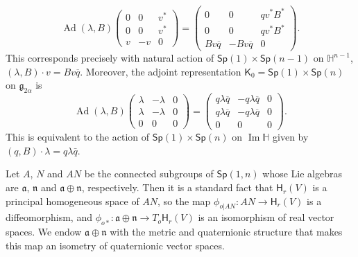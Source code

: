 \documentclass[12pt, a4paper]{amsart}
\newcommand{\g}{\mathfrak}
\newcommand{\Ad}{\operatorname{Ad}}
\renewcommand{\H}{\mathbb{H}}
\renewcommand{\Im}{\operatorname{Im}}
\newcommand{\Sp}{\mathsf{Sp}}
\theoremstyle{remark}
\begin{document}
\[
\Ad(\lambda,B)\left(
\begin{array}{cc|c}
	0 & 0 & v^*\\
	0 & 0 & v^*\\
	\hline
	v & -v & 0
\end{array}
\right)
=\left(
\begin{array}{cc|c}
	0 & 0 & qv^*B^*\\
	0 & 0 & qv^*B^*\\
	\hline
	Bv\overline{q} & -Bv\overline{q} & 0
\end{array}
\right).
\]
This corresponds precisely with natural action of $\mathsf{Sp}(1)\times\mathsf{Sp}(n-1)$ on $\H^{n-1}$, $(\lambda,B)\cdot v=Bv\overline{q}$.
Moreover, the adjoint representation $\mathsf{K}_{0}=\Sp(1)\times\Sp(n)$ on $\g{g}_{2\alpha}$ is
\[
\Ad(\lambda,B)\left(
\begin{array}{cc|c}
	\lambda & -\lambda & 0\\
	\lambda & -\lambda & 0\\
	\hline
	0 & 0 & 0
\end{array}
\right)
=\left(
\begin{array}{cc|c}
	q\lambda\overline{q} & -q\lambda\overline{q} & 0\\
	q\lambda\overline{q} & -q\lambda\overline{q} & 0\\
	\hline
	0 & 0 & 0
\end{array}
\right).
\]
This is equivalent to the action of $\Sp(1)\times\Sp(n)$ on $\Im\H$ given by $(q,B)\cdot \lambda=q\lambda\bar{q}$.
	
Let ${A}$, ${N}$ and ${AN}$ be the connected subgroups of $\mathsf{Sp}(1,n)$ whose Lie algebras are $\g{a}$, $\g{n}$ and $\g{a}\oplus \g{n}$, respectively.
Then it is a standard fact that $\mathsf{H}_r(V)$ is a principal homogeneous space of ${AN}$, 
so the map $\phi_{o\vert AN}\colon AN\to \mathsf{H}_r(V)$ is a diffeomorphism,
and $\phi_{o*}\colon\g{a}\oplus\g{n}\to T_o\mathsf{H}_r(V)$ is an isomorphism of real vector spaces.
We endow $\g{a}\oplus\g{n}$ with the metric and quaternionic structure that makes this map an isometry of quaternionic vector spaces.
\end{document}
